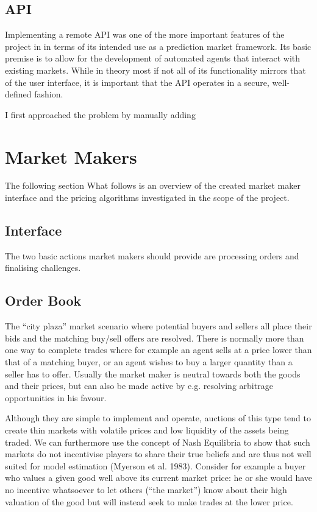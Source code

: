 \documentclass[bsc,frontabs,twoside,singlespacing,parskip,deptreport]{infthesis}     %
\begin{document}
\subsection{API}
    
	Implementing a remote API was one of the more important features of the project in in terms of its intended use as a prediction market framework. Its basic premise is to allow for the development of automated agents that interact with existing markets. While in theory most if not all of its functionality mirrors that of the user interface, it is important that the API operates in a secure, well-defined fashion. 
    
    I first approached the problem by manually adding 
    
\section{Market Makers}
    The following section 
	What follows is an overview of the created market maker interface and the pricing algorithms investigated in the scope of the project. 

\subsection{Interface}
	The two basic actions market makers should provide are processing orders and finalising challenges. 
	
\subsection{Order Book}
	
	The “city plaza” market scenario where potential buyers and sellers all place their bids and the matching buy/sell offers are resolved. There is normally more than one way to complete trades where for example an agent sells at a price lower than that of a matching buyer, or an agent wishes to buy a larger quantity than a seller has to offer. Usually the market maker is neutral towards both the goods and their prices, but can also be made active by e.g. resolving arbitrage opportunities in his favour.

	Although they are simple to implement and operate, auctions of this type tend to create thin markets with volatile prices and low liquidity of the assets being traded. We can furthermore use the concept of Nash Equilibria to show that such markets do not incentivise players to share their true beliefs and are thus not well suited for model estimation (Myerson et al. 1983). Consider for example a buyer who values a given good well above its current market price: he or she would have no incentive whatsoever to let others (“the market”) know about their high valuation of the good but will instead seek to make trades at the lower price.
	
\end{document}
